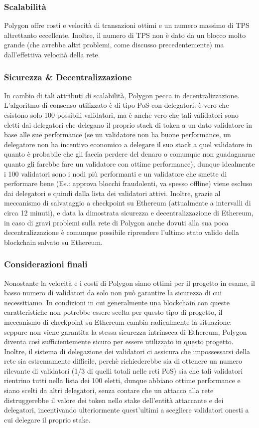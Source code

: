 \documentclass[a4paper, 12pt]{article}
\begin{document}
\subsubsection*{Scalabilità}
Polygon offre costi e velocità di transazioni ottimi e un numero massimo di TPS altrettanto eccellente.
Inoltre, il numero di TPS non è dato da un blocco molto grande (che avrebbe altri problemi, come discusso precedentemente) ma dall'effettiva velocità della rete.

\subsubsection*{Sicurezza \& Decentralizzazione}
In cambio di tali attributi di scalabilità, Polygon pecca in decentralizzazione.
L'algoritmo di consenso utilizzato è di tipo PoS con delegatori: è vero che esistono solo 100 possibili validatori, ma è anche vero che tali validatori sono eletti dai delegatori che delegano il proprio stack di token a un dato validatore in base alle sue performance (se un validatore non ha buone performance, un delegatore non ha incentivo economico a delegare il suo stack a quel validatore in quanto è probabile che gli faccia perdere del denaro o comunque non guadagnarne quanto gli farebbe fare un validatore con ottime performance), dunque idealmente i 100 validatori sono i nodi più performanti e un validatore che smette di performare bene (Es.: approva blocchi fraudolenti, va spesso offline) viene escluso dai delegatori e quindi dalla lista dei validatori attivi.
Inoltre, grazie al meccanismo di salvataggio a checkpoint su Ethereum (attualmente a intervalli di circa 12 minuti), e data la dimostrata sicurezza e decentralizzazione di Ethereum,
in caso di gravi problemi sulla rete di Polygon anche dovuti alla sua poca decentralizzazione è comunque possibile riprendere l'ultimo stato valido della blockchain salvato su Ethereum.

\subsubsection*{Considerazioni finali}
Nonostante la velocità e i costi di Polygon siano ottimi per il progetto in esame, il basso numero di validatori da solo non può garantire la sicurezza di cui necessitiamo.
In condizioni in cui generalmente una blockchain con queste caratteristiche non potrebbe essere scelta per questo tipo di progetto, il meccanismo di checkpoint su Ethereum cambia radicalmente la situazione: seppure non viene garantita la stessa sicurezza intrinseca di Ethereum, Polygon diventa così sufficientemente sicuro per essere utilizzato in questo progetto.
Inoltre, il sistema di delegazione dei validatori ci assicura che impossessarsi della rete sia estremamente difficile, perchè richiederebbe sia di ottenere un numero rilevante di validatori (1/3 di quelli totali nelle reti PoS) sia che tali validatori rientrino tutti nella lista dei 100 eletti, dunque abbiano ottime performance e siano scelti da altri delegatori,
senza contare che un attacco alla rete distruggerebbe il valore dei token nello stake dell'entità attaccante e dei delegatori, incentivando ulteriormente quest'ultimi a scegliere validatori onesti a cui delegare il proprio stake.
\end{document}

